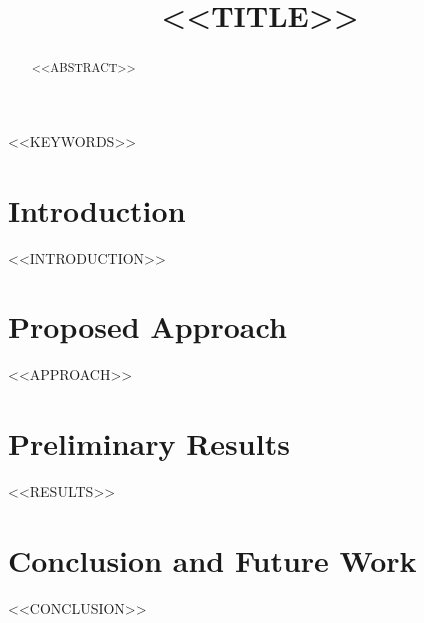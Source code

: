 \documentclass[conference]{IEEEtran}
\begin{document}
\title{<<TITLE>>}

\author{
}

\maketitle

\begin{abstract}
<<ABSTRACT>>
\end{abstract}

\begin{IEEEkeywords}
<<KEYWORDS>>
\end{IEEEkeywords}

\section{Introduction}
<<INTRODUCTION>>

\section{Proposed Approach}
<<APPROACH>>

\section{Preliminary Results}
<<RESULTS>>

\section{Conclusion and Future Work}
<<CONCLUSION>>

\balance



\end{document}
